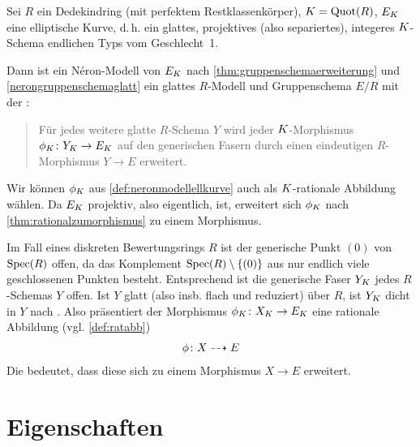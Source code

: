 \documentclass[german, bibliography=totoc]{scrreprt}
\renewcommand*{\optcite}[2][]{}
\begin{document}

\begin{Bemerkung}
  \label{def:neronmodellellkurve}
  Sei $R$ ein Dedekindring (mit perfektem Restklassenkörper),
  $K=\operatorname{Quot}(R)$, $E_{K}$ eine elliptische Kurve, d.\,h. ein
  glattes, projektives (also separiertes), integeres
  $K$-Schema endlichen Typs vom Geschlecht~1.
  
  Dann ist ein Néron-Modell von $E_{K}$ nach
  \ref{thm:gruppenschemaerweiterung} und \ref{nerongruppenschemaglatt}
  ein glattes $R$-Modell und Gruppenschema $E/R$ mit der
  \NAbbEig:
  \begin{quote}
    Für jedes weitere glatte $R$-Schema $Y$ wird jeder
    $K$-Morphismus $\phi_{K}\colon Y_{K}\to E_{K}$ auf den generischen
    Fasern durch einen eindeutigen $R$-Morphismus $Y\to E$ erweitert.
  \end{quote}
  \optcite[Chapter IV.5]{silverman2}
\end{Bemerkung}
\begin{Bemerkung}\label{thm:dichtefaser}
  Wir können $\phi_{K}$ aus \ref{def:neronmodellellkurve} auch als
  $K$-rationale Abbildung wählen. Da $E_{K}$ projektiv, also eigentlich,
  ist, erweitert sich $\phi_{K}$ nach
  \ref{thm:rationalzumorphismus} zu einem Morphismus.

  Im Fall eines diskreten Bewertungsrings $R$ ist der generische Punkt
  $(0)$ von $\operatorname{Spec}(R)$ offen, da das Komplement
  $\operatorname{Spec}(R)\setminus\{(0)\}$ aus nur endlich viele geschlossenen
  Punkten besteht. Entsprechend ist die generische Faser $Y_{K}$ jedes
  $R$-Schemas $Y$ offen.
  Ist $Y$ glatt (also insb. flach und reduziert) über $R$, ist $Y_{K}$
  dicht in $Y$ nach \cite[Proposition III.9.7]{hartshorne}.
  Also präsentiert der Morphismus $\phi_{K}\colon X_{K}\to E_{K}$ eine
  rationale Abbildung (vgl. \ref{def:ratabb})
  \begin{gather*}
    \phi\colon X\dashrightarrow E
  \end{gather*}
  Die \NAbbEig bedeutet, dass diese sich zu einem Morphismus $X\to E$
  erweitert.
\end{Bemerkung}


\section{Eigenschaften}
\end{document}
